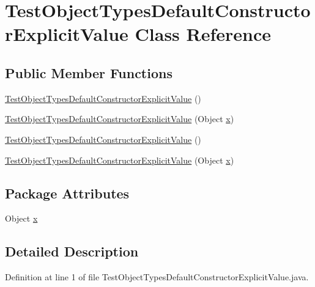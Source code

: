 \hypertarget{classTestObjectTypesDefaultConstructorExplicitValue}{
\section{TestObjectTypesDefaultConstructorExplicitValue Class Reference}
\label{classTestObjectTypesDefaultConstructorExplicitValue}
}
\subsection*{Public Member Functions}
\begin{DoxyCompactItemize}
\item 
\hyperlink{classTestObjectTypesDefaultConstructorExplicitValue_a2d00b3746ca1edbc03028209d920e6e8}{TestObjectTypesDefaultConstructorExplicitValue} ()
\item 
\hyperlink{classTestObjectTypesDefaultConstructorExplicitValue_ae35f04eb3a45130ceda3c47879db6bb8}{TestObjectTypesDefaultConstructorExplicitValue} (Object \hyperlink{classTestObjectTypesDefaultConstructorExplicitValue_a7f1f5fae9182a2110bbb4bb6f45d2285}{x})
\item 
\hyperlink{classTestObjectTypesDefaultConstructorExplicitValue_a2d00b3746ca1edbc03028209d920e6e8}{TestObjectTypesDefaultConstructorExplicitValue} ()
\item 
\hyperlink{classTestObjectTypesDefaultConstructorExplicitValue_ae35f04eb3a45130ceda3c47879db6bb8}{TestObjectTypesDefaultConstructorExplicitValue} (Object \hyperlink{classTestObjectTypesDefaultConstructorExplicitValue_a7f1f5fae9182a2110bbb4bb6f45d2285}{x})
\end{DoxyCompactItemize}
\subsection*{Package Attributes}
\begin{DoxyCompactItemize}
\item 
Object \hyperlink{classTestObjectTypesDefaultConstructorExplicitValue_a7f1f5fae9182a2110bbb4bb6f45d2285}{x}
\end{DoxyCompactItemize}


\subsection{Detailed Description}


Definition at line 1 of file TestObjectTypesDefaultConstructorExplicitValue.java.



